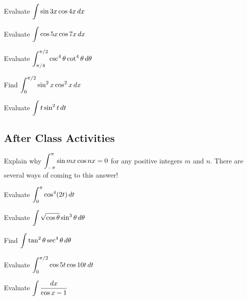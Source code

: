 \documentclass[notes]{subfiles}
\begin{document}
		\begin{ex}
			Evaluate $\displaystyle \int \sin 3x\cos 4x\, dx$
		\end{ex}
			
		\begin{ex}
			Evaluate $\displaystyle \int \cos 5x\cos 7x\, dx$
		\end{ex}
			
		\begin{ex}
			Evaluate $\displaystyle \int_{\pi/4}^{\pi/2} \csc^4\theta\cot^4\theta\, d\theta$
		\end{ex}
			\newpage
			
		\begin{ex}
			Find $\displaystyle \int_0^{\pi/2} \sin^2x\cos^2x\, dx$
		\end{ex}
			
		\begin{ex}
			Evaluate $\displaystyle \int t\sin^2 t\, dt$
		\end{ex}
			\newpage
	\subsection*{After Class Activities}
		\begin{ex}
			Explain why $\displaystyle \int_{-\pi}^{\pi} \sin mx \cos nx = 0$ for any positive integers $m$ and $n$.  There are several ways of coming to this answer!
		\end{ex}
			
		\begin{ex}
			Evaluate $\displaystyle \int_0^\pi \cos^4(2t)\, dt$
		\end{ex}
			
		\begin{ex}
			Evaluate $\displaystyle \int \sqrt{\cos\theta}\sin^3\theta \, d\theta$
		\end{ex}
			\newpage
			
		\begin{ex}
			Find $\displaystyle \int \tan^2\theta \sec^4\theta\, d\theta$
		\end{ex}
			
		\begin{ex}
			Evaluate $\displaystyle \int_0^{\pi/2} \cos 5t\cos 10t\, dt$
		\end{ex}
			
		\begin{ex}
			Evaluate $\displaystyle \int \dfrac{dx}{\cos x - 1}$
		\end{ex}
\clearpage
\end{document}
